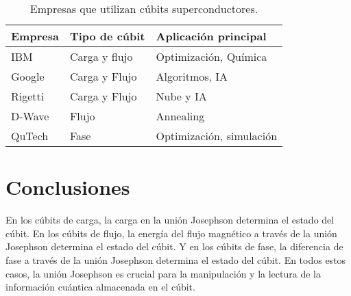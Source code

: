 \documentclass[11pt]{article}
\begin{document}
 \begin{table}[ht]
  \begin{center}
    \begin{tabularx}{\textwidth}{|X|X|X|}
      \hline
      \textbf{Empresa} & \textbf{Tipo de cúbit} & \textbf{Aplicación principal} \\ \hline
       IBM & Carga y flujo & Optimización, Química \\
      Google & Carga y Flujo & Algoritmos, IA \\
      Rigetti & Carga y Flujo & Nube y IA \\
      D-Wave & Flujo & Annealing \\
      QuTech & Fase & Optimización, simulación \\ \hline
    \end{tabularx}
  \caption{Empresas que utilizan cúbits superconductores.}
  \label{tab:empresas-qubits-superconductores}
  \end{center}
\end{table}

\section{Conclusiones}
En los cúbits de carga, la carga en la unión Josephson determina el estado del cúbit. En los cúbits de flujo, la energía del flujo magnético a través de la unión Josephson determina el estado del cúbit. Y en los cúbits de fase, la diferencia de fase a través de la unión Josephson determina el estado del cúbit. En todos estos casos, la unión Josephson es crucial para la manipulación y la lectura de la información cuántica almacenada en el cúbit.

\newpage
\printbibliography
\end{document}
